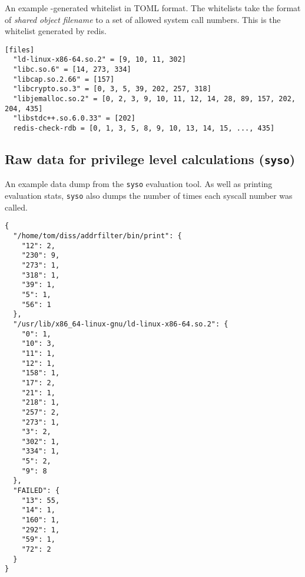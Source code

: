 \begin{listing}[H]
  \caption{An example \afss-generated whitelist in TOML
  format. The whitelists take the format of \textit{shared object filename} to a
set of allowed system call numbers. This is the whitelist generated by
redis.}\label{lst:toml-whitelist}
  \begin{verbatim}
[files]
  "ld-linux-x86-64.so.2" = [9, 10, 11, 302]
  "libc.so.6" = [14, 273, 334]
  "libcap.so.2.66" = [157]
  "libcrypto.so.3" = [0, 3, 5, 39, 202, 257, 318]
  "libjemalloc.so.2" = [0, 2, 3, 9, 10, 11, 12, 14, 28, 89, 157, 202, 204, 435]
  "libstdc++.so.6.0.33" = [202]
  redis-check-rdb = [0, 1, 3, 5, 8, 9, 10, 13, 14, 15, ..., 435]
  \end{verbatim}
\end{listing}

\subsection{Raw data for privilege level calculations (\texttt{syso})}
\begin{listing}[H]
    \caption{An example data dump from the \texttt{syso} evaluation tool. As
    well as printing evaluation stats, \texttt{syso} also dumps the number of
times each syscall number was called.}\label{lst:syso-data-dump}
  \begin{verbatim}
{
  "/home/tom/diss/addrfilter/bin/print": {
    "12": 2,
    "230": 9,
    "273": 1,
    "318": 1,
    "39": 1,
    "5": 1,
    "56": 1
  },
  "/usr/lib/x86_64-linux-gnu/ld-linux-x86-64.so.2": {
    "0": 1,
    "10": 3,
    "11": 1,
    "12": 1,
    "158": 1,
    "17": 2,
    "21": 1,
    "218": 1,
    "257": 2,
    "273": 1,
    "3": 2,
    "302": 1,
    "334": 1,
    "5": 2,
    "9": 8
  },
  "FAILED": {
    "13": 55,
    "14": 1,
    "160": 1,
    "292": 1,
    "59": 1,
    "72": 2
  }
}
  \end{verbatim}
\end{listing}

